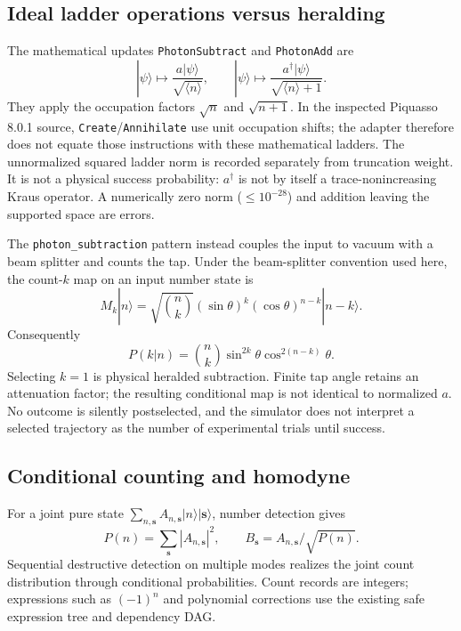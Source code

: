 \subsection{Ideal ladder operations versus heralding}

The mathematical updates \texttt{PhotonSubtract} and \texttt{PhotonAdd} are
\begin{equation}
 |\psi\rangle\longmapsto
 \frac{a|\psi\rangle}{\sqrt{\langle n\rangle}},\qquad
 |\psi\rangle\longmapsto
 \frac{a^\dagger|\psi\rangle}{\sqrt{\langle n\rangle+1}}.
\end{equation}
They apply the occupation factors $\sqrt n$ and $\sqrt{n+1}$. In the inspected
Piquasso 8.0.1 source, \texttt{Create}/\texttt{Annihilate} use unit occupation
shifts; the adapter therefore does not equate those instructions with these
mathematical ladders. The unnormalized squared ladder norm is recorded
separately from truncation weight. It is not a physical success probability:
$a^\dagger$ is not by itself a trace-nonincreasing Kraus operator. A numerically
zero norm ($\leq10^{-28}$) and addition leaving the supported space are errors.

The \texttt{photon\_subtraction} pattern instead couples the input to vacuum
with a beam splitter and counts the tap. Under the beam-splitter convention
used here, the count-$k$ map on an input number state is
\begin{equation}
 M_k|n\rangle=
 \sqrt{\binom nk}(\sin\theta)^k(\cos\theta)^{n-k}|n-k\rangle.
\end{equation}
Consequently
\begin{equation}
 P(k|n)=\binom nk\sin^{2k}\theta\cos^{2(n-k)}\theta.
\end{equation}
Selecting $k=1$ is physical heralded subtraction. Finite tap angle retains an
attenuation factor; the resulting conditional map is not identical to normalized
$a$. No outcome is silently postselected, and the simulator does not interpret
a selected trajectory as the number of experimental trials until success.

\subsection{Conditional counting and homodyne}

For a joint pure state $\sum_{n,\bm s}A_{n,\bm s}|n\rangle|\bm s\rangle$,
number detection gives
\begin{equation}
 P(n)=\sum_{\bm s}|A_{n,\bm s}|^2,\qquad
 B_{\bm s}=A_{n,\bm s}/\sqrt{P(n)}.
\end{equation}
Sequential destructive detection on multiple modes realizes the joint count
distribution through conditional probabilities. Count records are integers;
expressions such as $(-1)^n$ and polynomial corrections use the existing safe
expression tree and dependency DAG.

